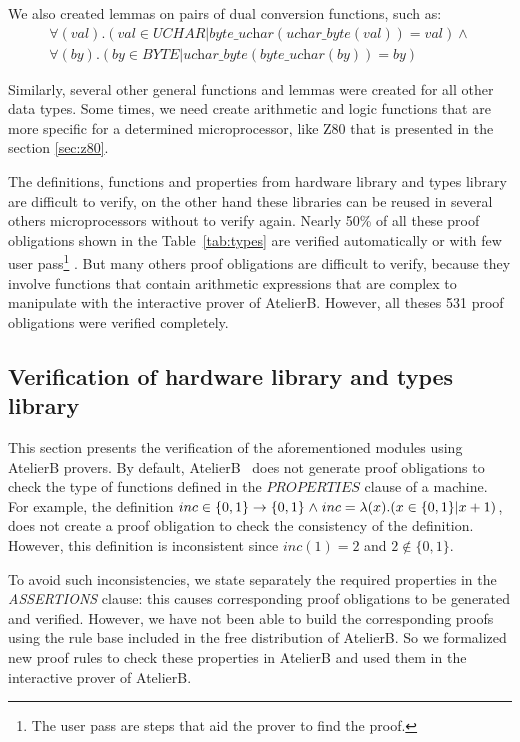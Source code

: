 \documentclass[a4paper]{llncs}
\begin{document}
We also created lemmas on pairs of dual conversion functions, such as:
$$
 \begin{array}{l}
  \forall (val) . (val \in \textit{UCHAR} |
  \textit{byte\_uchar}(\textit{uchar\_byte}(val)) = val) \land\\
  \forall (by) . (by \in \textit{BYTE} |
  \textit{uchar\_byte}(\textit{byte\_uchar}(by)) = by)
 \end{array}
$$

Similarly, several other general functions and lemmas were created for all other data types.
Some times, we need  create arithmetic and logic functions that are more specific for a
determined microprocessor, like Z80 that is presented in the section \ref{sec:z80}. 

The definitions, functions and properties from hardware library and types library are difficult to verify,
on the other hand  these libraries can be reused in several others  microprocessors without to verify again.
Nearly 50\% of all these proof obligations shown in the Table~\ref{tab:types} are verified automatically 
or with few user pass\footnote{The user pass are steps that aid the prover to find the proof.} .
But many others proof obligations are difficult to verify, because they involve functions
that contain arithmetic expressions that are complex to manipulate with the interactive
prover of AtelierB.  However, all theses 531 proof obligations were verified completely.


\subsection{Verification of hardware library and types library} 
\label{sec:VerificationHardwareLibrary}

This section presents the verification of the aforementioned modules
using AtelierB provers.  By default, AtelierB~\cite{atelierB} does not
generate proof obligations to check the type of functions defined in
the $PROPERTIES$ clause of a machine. For example, the definition $inc
\in \{0,1\} \fun \{0,1\} \land inc = \lambda(x).( x \in \{0,1\} | x +
1)$, does not create a proof obligation to check the consistency of
the definition. However, this definition is inconsistent since
$inc(1)=2$ and $ 2 \not\in \{0,1\}$.

To avoid such inconsistencies, we state separately the required
properties in the \textit{ASSERTIONS\/} clause: this causes
corresponding proof obligations to be generated and verified. However,
we have not been able to build the corresponding proofs using the 
rule base included in the free distribution of AtelierB. So we
formalized new proof rules to check these properties in AtelierB and
used them in the interactive prover of AtelierB.
\end{document}
